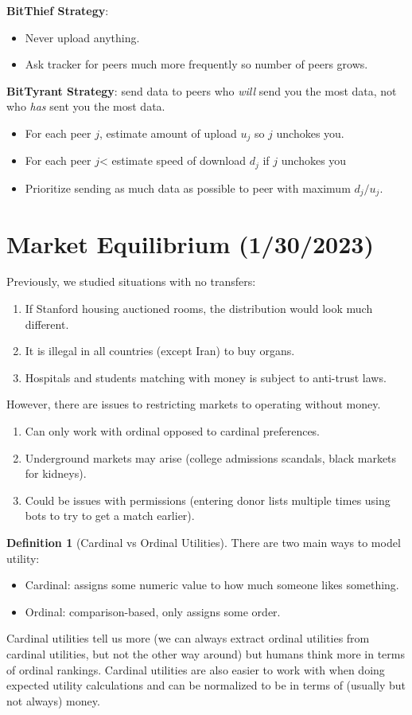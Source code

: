 \documentclass[dvipsnames]{article}
\theoremstyle{definition}
\newtheorem{definition}{Definition}[section]
\theoremstyle{remark}
\begin{document}
\textbf{BitThief Strategy}:
\begin{itemize}
	\item Never upload anything.
	\item Ask tracker for peers much more frequently so number of peers grows.
\end{itemize}

\textbf{BitTyrant Strategy}: send data to peers who \textit{will} send you the most data, not who \textit{has} sent you the most data.
\begin{itemize}
	\item For each peer $j$, estimate amount of upload $u_j$ so $j$ unchokes you.
	\item For each peer $j$< estimate speed of download $d_j$ if $j$ unchokes you
	\item Prioritize sending as much data as possible to peer with maximum $d_j/u_j$.
\end{itemize}

\newpage

\section{Market Equilibrium (1/30/2023)}

Previously, we studied situations with no transfers:
\begin{enumerate}
	\item If Stanford housing auctioned rooms, the distribution would look much different.
	\item It is illegal in all countries (except Iran) to buy organs.
	\item Hospitals and students matching with money is subject to anti-trust laws.
\end{enumerate}
However, there are issues to restricting markets to operating without money.
\begin{enumerate}
	\item Can only work with ordinal opposed to cardinal preferences.
	\item Underground markets may arise (college admissions scandals, black markets for kidneys).
	\item Could be issues with permissions (entering donor lists multiple times using bots to try to get a match earlier).
\end{enumerate}

\begin{definition}[Cardinal vs Ordinal Utilities]
	There are two main ways to model utility:
	\begin{itemize}
		\item Cardinal: assigns some numeric value to how much someone likes something.
		\item Ordinal: comparison-based, only assigns some order.
	\end{itemize}
	Cardinal utilities tell us more (we can always extract ordinal utilities from cardinal utilities, but not the other way around) but humans think more in terms of ordinal rankings. Cardinal utilities are also easier to work with when doing expected utility calculations and can be normalized to be in terms of (usually but not always) money.
\end{definition}
\end{document}
